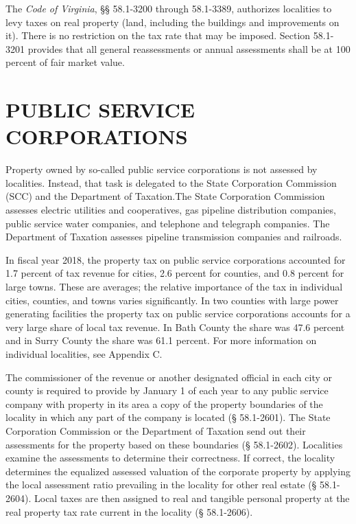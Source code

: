 \documentclass[
]{book}
\begin{document}
The \emph{Code of Virginia}, §§ 58.1-3200 through 58.1-3389, authorizes localities to levy taxes on real property (land, including the buildings and improvements on it). There is no restriction on the tax rate that may be imposed. Section 58.1-3201 provides that all general reassessments or annual assessments shall be at 100 percent of fair market value.

\hypertarget{public-service-corporations}{%
\section{PUBLIC SERVICE CORPORATIONS}\label{public-service-corporations}}

Property owned by so-called public service corporations is not assessed by localities. Instead, that task is delegated to the State Corporation Commission (SCC) and the Department of Taxation.The State Corporation Commission assesses electric utilities and cooperatives, gas pipeline distribution companies, public service water companies, and telephone and telegraph companies. The Department of Taxation assesses pipeline transmission companies and railroads.

In fiscal year 2018, the property tax on public service corporations accounted for 1.7 percent of tax revenue for cities, 2.6 percent for counties, and 0.8 percent for large towns. These are averages; the relative importance of the tax in individual cities, counties, and towns varies significantly. In two counties with large power generating facilities the property tax on public service corporations accounts for a very large share of local tax revenue. In Bath County the share was 47.6 percent and in Surry County the share was 61.1 percent. For more information on individual localities, see Appendix C.

The commissioner of the revenue or another designated official in each city or county is required to provide by January 1 of each year to any public service company with property in its area a copy of the property boundaries of the locality in which any part of the company is located (§ 58.1-2601). The State Corporation Commission or the Department of Taxation send out their assessments for the property based on these boundaries (§ 58.1-2602). Localities examine the assessments to determine their correctness. If correct, the locality determines the equalized assessed valuation of the corporate property by applying the local assessment ratio prevailing in the locality for other real estate (§ 58.1-2604). Local taxes are then assigned to real and tangible personal property at the real property tax rate current in the locality (§ 58.1-2606).
\end{document}
